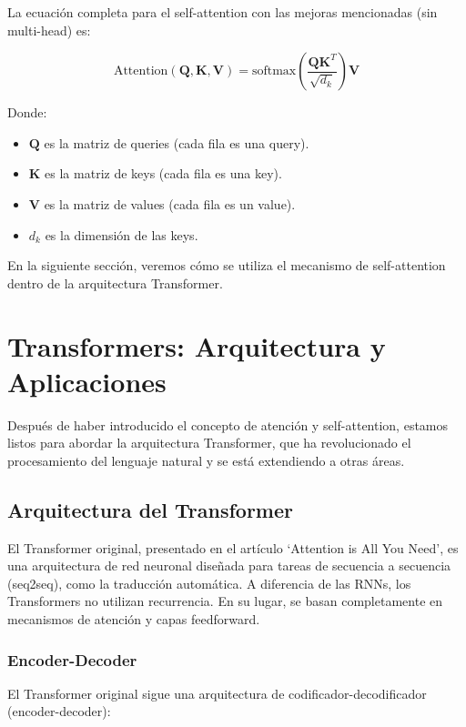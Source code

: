 \documentclass{article}
\begin{document}
La ecuación completa para el self-attention con las mejoras mencionadas (sin multi-head) es:

\[
\text{Attention}(\mathbf{Q}, \mathbf{K}, \mathbf{V}) = \text{softmax}\left(\frac{\mathbf{Q}\mathbf{K}^T}{\sqrt{d_k}}\right)\mathbf{V}
\]

Donde:

\begin{itemize}
    \item \(\mathbf{Q}\) es la matriz de queries (cada fila es una query).
    \item \(\mathbf{K}\) es la matriz de keys (cada fila es una key).
    \item \(\mathbf{V}\) es la matriz de values (cada fila es un value).
    \item \(d_k\) es la dimensión de las keys.
\end{itemize}

En la siguiente sección, veremos cómo se utiliza el mecanismo de self-attention dentro de la arquitectura Transformer.

\section{Transformers: Arquitectura y Aplicaciones}

Después de haber introducido el concepto de atención y self-attention, estamos listos para abordar la arquitectura Transformer, que ha revolucionado el procesamiento del lenguaje natural y se está extendiendo a otras áreas.

\subsection{Arquitectura del Transformer}

El Transformer original, presentado en el artículo `Attention is All You Need', es una arquitectura de red neuronal diseñada para tareas de secuencia a secuencia (seq2seq), como la traducción automática.  A diferencia de las RNNs, los Transformers no utilizan recurrencia.  En su lugar, se basan completamente en mecanismos de atención y capas feedforward.

\subsubsection{Encoder-Decoder}

El Transformer original sigue una arquitectura de codificador-decodificador (encoder-decoder):
\end{document}
